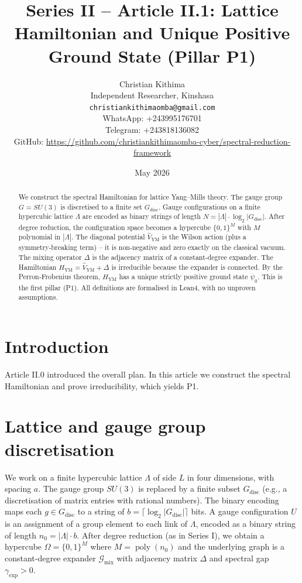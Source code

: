 \documentclass[11pt,a4paper]{article}
\title{Series II – Article II.1: Lattice Hamiltonian and Unique Positive Ground State (Pillar P1)}
\author{Christian Kithima \\
Independent Researcher, Kinshasa \\
\texttt{christiankithimaomba@gmail.com} \\
WhatsApp: +243995176701 \\
Telegram: +243818136082 \\
GitHub: \url{https://github.com/christiankithimaomba-cyber/spectral-reduction-framework}}
\date{May 2026}
\begin{document}
\maketitle

\begin{abstract}
We construct the spectral Hamiltonian for lattice Yang–Mills theory. The gauge group $G=SU(3)$ is discretised to a finite set $G_{\mathrm{disc}}$. Gauge configurations on a finite hypercubic lattice $\Lambda$ are encoded as binary strings of length $N = |\Lambda| \cdot \log_2 |G_{\mathrm{disc}}|$. After degree reduction, the configuration space becomes a hypercube $\{0,1\}^M$ with $M$ polynomial in $|\Lambda|$. The diagonal potential $\hat{V}_{\mathrm{YM}}$ is the Wilson action (plus a symmetry‑breaking term) – it is non‑negative and zero exactly on the classical vacuum. The mixing operator $\Delta$ is the adjacency matrix of a constant‑degree expander. The Hamiltonian $H_{\mathrm{YM}} = \hat{V}_{\mathrm{YM}} + \Delta$ is irreducible because the expander is connected. By the Perron‑Frobenius theorem, $H_{\mathrm{YM}}$ has a unique strictly positive ground state $\psi_0$. This is the first pillar (P1). All definitions are formalised in Lean4, with no unproven assumptions.
\end{abstract}

\tableofcontents

\section{Introduction}
Article II.0 introduced the overall plan. In this article we construct the spectral Hamiltonian and prove irreducibility, which yields P1.

\section{Lattice and gauge group discretisation}
We work on a finite hypercubic lattice $\Lambda$ of side $L$ in four dimensions, with spacing $a$. The gauge group $SU(3)$ is replaced by a finite subset $G_{\mathrm{disc}}$ (e.g., a discretisation of matrix entries with rational numbers). The binary encoding maps each $g\in G_{\mathrm{disc}}$ to a string of $b = \lceil \log_2 |G_{\mathrm{disc}}|\rceil$ bits. A gauge configuration $U$ is an assignment of a group element to each link of $\Lambda$, encoded as a binary string of length $n_0 = |\Lambda| \cdot b$. After degree reduction (as in Series I), we obtain a hypercube $\Omega = \{0,1\}^M$ where $M = \operatorname{poly}(n_0)$ and the underlying graph is a constant‑degree expander $\mathcal{G}_{\mathrm{mix}}$ with adjacency matrix $\Delta$ and spectral gap $\gamma_{\mathrm{exp}} > 0$.
\end{document}
